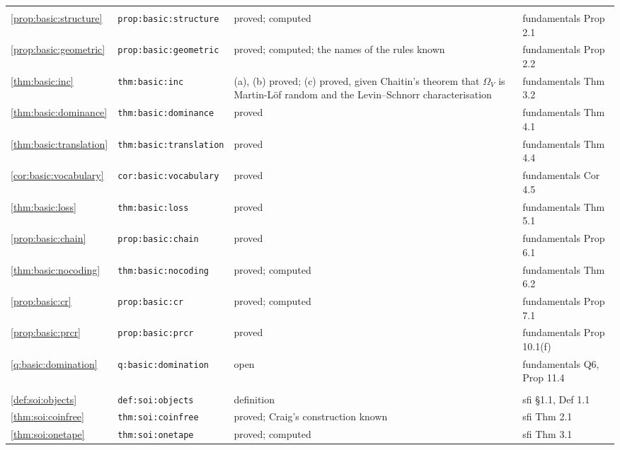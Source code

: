 {\begin{longtable}{@{}>{\raggedright\arraybackslash}p{}>{\raggedright\arraybackslash}p{}>{\raggedright\arraybackslash}p{}>{\raggedright\arraybackslash}p{}@{}}
\midrule
\multicolumn{4}{@{}l}{\texttt{basic.tex}}\\
\cref{prop:basic:structure} & \texttt{prop:\allowbreak basic:\allowbreak structure} & proved; computed & fundamentals Prop 2.1\\
\cref{prop:basic:geometric} & \texttt{prop:\allowbreak basic:\allowbreak geometric} & proved; computed; the names of the rules known & fundamentals Prop 2.2\\
\cref{thm:basic:inc} & \texttt{thm:\allowbreak basic:\allowbreak inc} & (a), (b) proved; (c) proved, given Chaitin's theorem that $\Omega_V$ is Martin-L\"of random and the Levin--Schnorr characterisation & fundamentals Thm 3.2\\
\cref{thm:basic:dominance} & \texttt{thm:\allowbreak basic:\allowbreak dominance} & proved & fundamentals Thm 4.1\\
\cref{thm:basic:translation} & \texttt{thm:\allowbreak basic:\allowbreak translation} & proved & fundamentals Thm 4.4\\
\cref{cor:basic:vocabulary} & \texttt{cor:\allowbreak basic:\allowbreak vocabulary} & proved & fundamentals Cor 4.5\\
\cref{thm:basic:loss} & \texttt{thm:\allowbreak basic:\allowbreak loss} & proved & fundamentals Thm 5.1\\
\cref{prop:basic:chain} & \texttt{prop:\allowbreak basic:\allowbreak chain} & proved & fundamentals Prop 6.1\\
\cref{thm:basic:nocoding} & \texttt{thm:\allowbreak basic:\allowbreak nocoding} & proved; computed & fundamentals Thm 6.2\\
\cref{prop:basic:cr} & \texttt{prop:\allowbreak basic:\allowbreak cr} & proved; computed & fundamentals Prop 7.1\\
\cref{prop:basic:prcr} & \texttt{prop:\allowbreak basic:\allowbreak prcr} & proved & fundamentals Prop 10.1(f)\\
\cref{q:basic:domination} & \texttt{q:\allowbreak basic:\allowbreak domination} & open & fundamentals Q6, Prop 11.4\\
\midrule
\multicolumn{4}{@{}l}{\texttt{soi.tex}}\\
\cref{def:soi:objects} & \texttt{def:\allowbreak soi:\allowbreak objects} & definition & sfi \S1.1, Def 1.1\\
\cref{thm:soi:coinfree} & \texttt{thm:\allowbreak soi:\allowbreak coinfree} & proved; Craig's construction known & sfi Thm 2.1\\
\cref{thm:soi:onetape} & \texttt{thm:\allowbreak soi:\allowbreak onetape} & proved; computed & sfi Thm 3.1\\

\end{longtable}}
